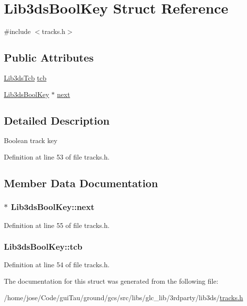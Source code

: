 \hypertarget{struct_lib3ds_bool_key}{\section{Lib3ds\-Bool\-Key Struct Reference}
\label{struct_lib3ds_bool_key}
}


{\ttfamily \#include $<$tracks.\-h$>$}

\subsection*{Public Attributes}
\begin{DoxyCompactItemize}
\item 
\hyperlink{struct_lib3ds_tcb}{Lib3ds\-Tcb} \hyperlink{struct_lib3ds_bool_key_ae6b7e2ed8fedd3ab99239c242075c5ac}{tcb}
\item 
\hyperlink{struct_lib3ds_bool_key}{Lib3ds\-Bool\-Key} $\ast$ \hyperlink{struct_lib3ds_bool_key_ac92f46bd18c9ed591dce3efaa532dceb}{next}
\end{DoxyCompactItemize}


\subsection{Detailed Description}
Boolean track key 

Definition at line 53 of file tracks.\-h.



\subsection{Member Data Documentation}
\hypertarget{struct_lib3ds_bool_key_ac92f46bd18c9ed591dce3efaa532dceb}{
\subsubsection[{next}]{$\ast$ Lib3ds\-Bool\-Key\-::next}}\label{struct_lib3ds_bool_key_ac92f46bd18c9ed591dce3efaa532dceb}


Definition at line 55 of file tracks.\-h.

\hypertarget{struct_lib3ds_bool_key_ae6b7e2ed8fedd3ab99239c242075c5ac}{
\subsubsection[{tcb}]{ Lib3ds\-Bool\-Key\-::tcb}}\label{struct_lib3ds_bool_key_ae6b7e2ed8fedd3ab99239c242075c5ac}


Definition at line 54 of file tracks.\-h.



The documentation for this struct was generated from the following file\-:\begin{DoxyCompactItemize}
\item 
/home/jose/\-Code/gui\-Tau/ground/gcs/src/libs/glc\-\_\-lib/3rdparty/lib3ds/\hyperlink{tracks_8h}{tracks.\-h}\end{DoxyCompactItemize}
